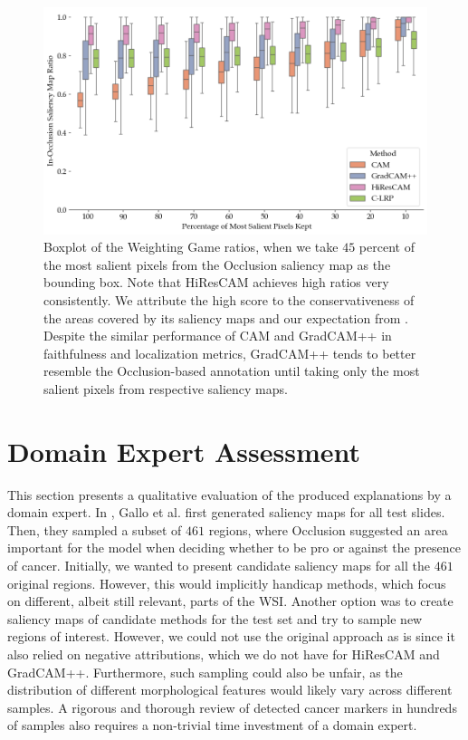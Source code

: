 \begin{figure}[t]
    \begin{center}
    \begin{minipage}{1\textwidth}
      \includegraphics[width=\textwidth]{img/occlusion-weighting-game-boxplot.png}
    \end{minipage}
    \caption{
    Boxplot of the Weighting Game ratios, when we take $45$ percent of the most salient pixels from the Occlusion saliency map as the bounding box.
    Note that HiResCAM achieves high ratios very consistently.
    We attribute the high score to the conservativeness of the areas covered by its saliency maps and our expectation from .
    Despite the similar performance of CAM and GradCAM++ in faithfulness and localization metrics, GradCAM++ tends to better resemble the Occlusion-based annotation until taking only the most salient pixels from respective saliency maps.
    }
    \label{fig:occ-weighting-game-boxplot}
    \end{center}
\end{figure}

\section{Domain Expert Assessment}

This section presents a qualitative evaluation of the produced explanations by a domain expert.
In \cite{gallo}, Gallo et al. first generated saliency maps for all test slides.
Then, they sampled a subset of $461$ regions, where Occlusion suggested an area important for the model when deciding whether to be pro or against the presence of cancer.
Initially, we wanted to present candidate saliency maps for all the $461$ original regions.
However, this would implicitly handicap methods, which focus on different, albeit still relevant, parts of the WSI. 
Another option was to create saliency maps of candidate methods for the test set and try to sample new regions of interest.
However, we could not use the original approach as is since it also relied on negative attributions, which we do not have for HiResCAM and GradCAM++.
Furthermore, such sampling could also be unfair, as the distribution of different morphological features would likely vary across different samples.
A rigorous and thorough review of detected cancer markers in hundreds of samples also requires a non-trivial time investment of a domain expert.

